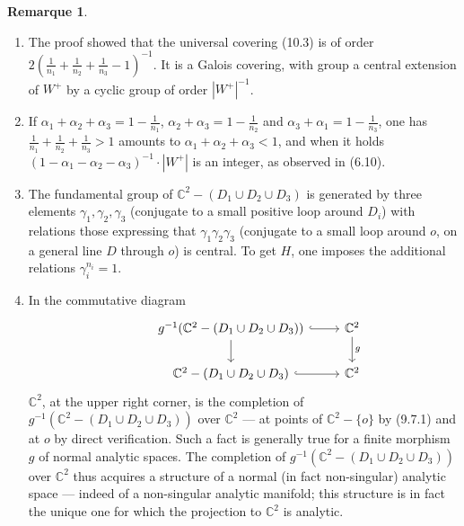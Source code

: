 \documentclass[12pt,a4paper]{article}
\theoremstyle{plain}
\theoremstyle{definition}
\newtheorem{remark}[theorem]{Remarque}
\theoremstyle{remark}
\begin{document}
\begin{remark}
\label{10.4}
\quad
\begin{enumerate}
\item[(i)] The proof showed that the universal covering (10.3) is of order $2 \left( \frac{1}{n_1} + \frac{1}{n_2} + \frac{1}{n_3} - 1 \right)^{-1}$. It is a Galois covering, with group a central extension of $W^+$ by a cyclic group of order $|W^+|^{-1}$.
\item[(ii)] If $\alpha_1 + \alpha_2 + \alpha_3 = 1 - \frac{1}{n_1}$, $\alpha_2 + \alpha_3 = 1 - \frac{1}{n_2}$ and $\alpha_3 + \alpha_1 = 1 - \frac{1}{n_3}$, one has $\frac{1}{n_1} + \frac{1}{n_2} + \frac{1}{n_3} > 1$ amounts to $\alpha_1 + \alpha_2 + \alpha_3 < 1$, and when it holds $(1 - \alpha_1 - \alpha_2 - \alpha_3)^{-1} \cdot |W^+|$ is an integer, as observed in (6.10).
\item[(iii)] The fundamental group of $\mathbb{C}^2 - (D_1 \cup D_2 \cup D_3)$ is generated by three elements $\gamma_1, \gamma_2, \gamma_3$ (conjugate to a small positive loop around $D_i$) with relations those expressing that $\gamma_1 \gamma_2 \gamma_3$ (conjugate to a small loop around $o$, on a general line $D$ through $o$) is central. To get $H$, one imposes the additional relations $\gamma_i^{n_i} = 1$.
\item[(iv)] In the commutative diagram
\[
\begin{tikzcd}
& g^{-1}(\mathbb{C}^2 - (D_1 \cup D_2 \cup D_3)) \arrow[r, hook] \arrow[d] & \mathbb{C}^2 \arrow[d, "g"] \\
& \mathbb{C}^2 - (D_1 \cup D_2 \cup D_3) \arrow[r, hook] & \mathbb{C}^2
\end{tikzcd}
\]
$\mathbb{C}^2$, at the upper right corner, is the completion of $g^{-1}(\mathbb{C}^2 - (D_1 \cup D_2 \cup D_3))$ over $\mathbb{C}^2$ --- at points of $\mathbb{C}^2 - \{o\}$ by (9.7.1) and at $o$ by direct verification. Such a fact is generally true for a finite morphism $g$ of normal analytic spaces. The completion of $g^{-1}(\mathbb{C}^2 - (D_1 \cup D_2 \cup D_3))$ over $\mathbb{C}^2$ thus acquires a structure of a normal (in fact non-singular) analytic space --- indeed of a non-singular analytic manifold; this structure is in fact the unique one for which the projection to $\mathbb{C}^2$ is analytic.
\end{enumerate}
\end{remark}
\end{document}
